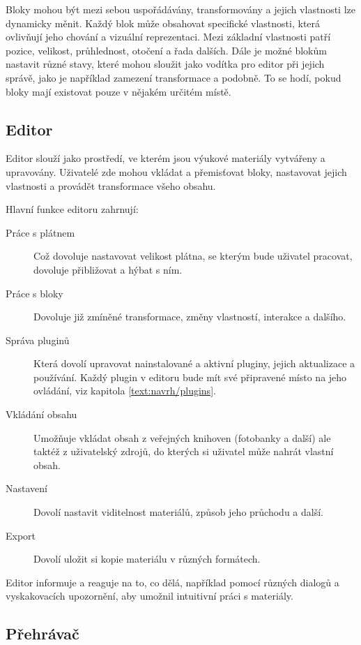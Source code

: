 Bloky mohou být mezi sebou uspořádávány, transformovány a jejich vlastnosti lze dynamicky měnit. 
Každý blok může obsahovat specifické vlastnosti, která ovlivňují jeho chování a vizuální reprezentaci.
Mezi základní vlastnosti patří pozice, velikost, průhlednost, otočení a řada dalších.
Dále je možné blokům nastavit různé stavy, které mohou sloužit jako vodítka pro editor při jejich správě, jako je například zamezení transformace a podobně.
To se hodí, pokud bloky mají existovat pouze v nějakém určitém místě.

\subsection{Editor}

Editor slouží jako prostředí, ve kterém jsou výukové materiály vytvářeny a upravovány. 
Uživatelé zde mohou vkládat a přemisťovat bloky, nastavovat jejich vlastnosti a provádět transformace všeho obsahu.

Hlavní funkce editoru zahrnují:
\begin{description}
    \item[Práce s plátnem] Což dovoluje nastavovat velikost plátna, se kterým bude uživatel pracovat, dovoluje přibližovat a hýbat s ním.
    \item[Práce s bloky] Dovoluje již zmíněné transformace, změny vlastností, interakce a dalšího.
    \item[Správa pluginů] Která dovolí upravovat nainstalované a aktivní pluginy, jejich aktualizace a používání. Každý plugin v editoru bude mít své připravené místo na jeho ovládání, viz kapitola \ref{text:navrh/plugins}.
    \item[Vkládání obsahu] Umožňuje vkládat obsah z veřejných knihoven (fotobanky a další) ale taktéž z uživatelský zdrojů, do kterých si uživatel může nahrát vlastní obsah.
    \item[Nastavení] Dovolí nastavit viditelnost materiálů, způsob jeho průchodu a další.
    \item[Export] Dovolí uložit si kopie materiálu v různých formátech.
\end{description}

Editor informuje a reaguje na to, co dělá, například pomocí různých dialogů a vyskakovacích upozornění, aby umožnil intuitivní práci s materiály.

\subsection{Přehrávač}

